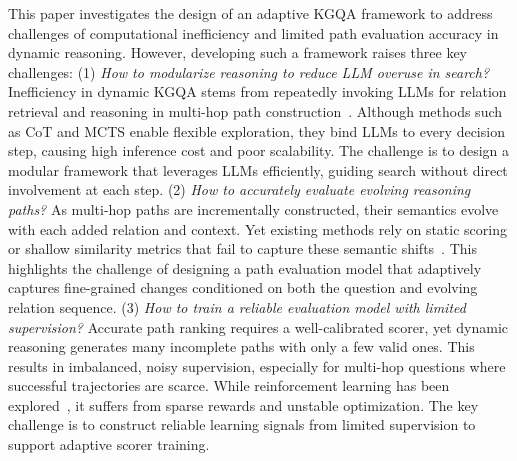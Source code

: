 This paper investigates the design of an adaptive KGQA framework to address challenges of computational inefficiency and limited path evaluation accuracy in dynamic reasoning. However, developing such a framework raises three key challenges: (1) \textit{How to modularize reasoning to reduce LLM overuse in search?} Inefficiency in dynamic KGQA stems from repeatedly invoking LLMs for relation retrieval and reasoning in multi-hop path construction~\citep{shen2025reasoning,long2025enhancing}. Although methods such as CoT and MCTS enable flexible exploration, they bind LLMs to every decision step, causing high inference cost and poor scalability. The challenge is to design a modular framework that leverages LLMs efficiently, guiding search without direct involvement at each step. (2) \textit{How to accurately evaluate evolving reasoning paths?} As multi-hop paths are incrementally constructed, their semantics evolve with each added relation and context. Yet existing methods rely on static scoring or shallow similarity metrics that fail to capture these semantic shifts~\citep{xu2024llm,sui2024fidelis}. This highlights the challenge of designing a path evaluation model that adaptively captures fine-grained changes conditioned on both the question and evolving relation sequence. (3) \textit{How to train a reliable evaluation model with limited supervision?} Accurate path ranking requires a well-calibrated scorer, yet dynamic reasoning generates many incomplete paths with only a few valid ones. This results in imbalanced, noisy supervision, especially for multi-hop questions where successful trajectories are scarce. While reinforcement learning has been explored~\citep{ma2024coevolving,zhai2024fine}, it suffers from sparse rewards and unstable optimization. The key challenge is to construct reliable learning signals from limited supervision to support adaptive scorer training.

